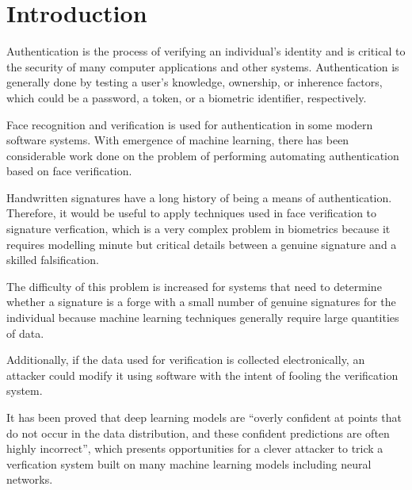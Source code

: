 \section{Introduction}\label{sec:introduction}

Authentication is the process of verifying an individual's identity and is critical to the security of many computer applications and other systems.
Authentication is generally done by testing a user's knowledge, ownership, or inherence factors, which could be a password, a token, or a biometric identifier, respectively\cite{authentication}.

Face recognition and verification is used for authentication in some modern software systems.
With emergence of machine learning, there has been considerable work done on the problem of performing automating authentication based on face verification\cite{sig_net}.

Handwritten signatures have a long history of being a means of authentication\cite{handwriting_survey}.
Therefore, it would be useful to apply techniques used in face verification to signature verfication, which is a very complex problem in biometrics because it requires modelling minute but critical details between a genuine signature and a skilled falsification\cite{sig_net}.

The difficulty of this problem is increased for systems that need to determine whether a signature is a forge with a small number of genuine signatures for the individual because machine learning techniques generally require large quantities of data.

Additionally, if the data used for verification is collected electronically, an attacker could modify it using software with the intent of fooling the verification system.

It has been proved that deep learning models are ``overly confident at points that do not occur in the data distribution, and these confident predictions are often highly incorrect'', which presents opportunities for a clever attacker to trick a verfication system built on many machine learning models including neural networks\cite{goodfellow}.
